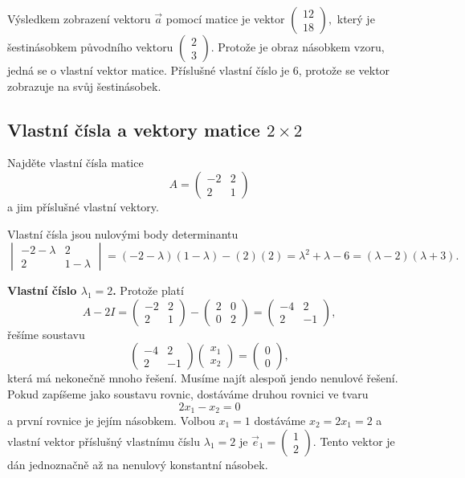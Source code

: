 Výsledkem zobrazení vektoru $\vec a$ pomocí matice je vektor $
\begin{pmatrix}
  12\\18
\end{pmatrix},
$ který je šestinásobkem původního vektoru $
\begin{pmatrix}
  2\\3
\end{pmatrix}$.
Protože je obraz násobkem vzoru, jedná se o vlastní vektor matice. Příslušné vlastní číslo je $6$, protože se vektor zobrazuje na svůj šestinásobek.

\konec


\stranka
\subsection{Vlastní čísla a vektory matice $2\times 2$}

Najděte vlastní čísla matice $$A=
\begin{pmatrix}
  -2 & 2 \\ 2 &1
\end{pmatrix}
$$
a jim příslušné vlastní vektory.

\reseni

Vlastní čísla jsou nulovými body determinantu
$$
\begin{vmatrix}
  -2-\lambda &2 \\ 2 & 1-\lambda
\end{vmatrix}
=(-2-\lambda)(1-\lambda)-(2)(2)=\lambda^2+\lambda-6=(\lambda-2)(\lambda+3).
$$

\textbf{Vlastní číslo $\lambda_1=2$.}
Protože platí $$A-2 I=
\begin{pmatrix}
  -2 & 2\\2&1
\end{pmatrix}
-
\begin{pmatrix}
  2&0\\0&2
\end{pmatrix}=\begin{pmatrix}
  -4 & 2\\ 2 &-1
\end{pmatrix},
$$
řešíme soustavu 
$$
\begin{pmatrix}
-4 & 2\\ 2 &-1
\end{pmatrix}
\begin{pmatrix}
  x_1\\x_2
\end{pmatrix}
=
\begin{pmatrix}
  0\\0
\end{pmatrix},
$$
která má nekonečně mnoho řešení. Musíme najít alespoň jendo nenulové řešení. Pokud zapíšeme jako soustavu rovnic, dostáváme druhou rovnici ve tvaru
$$2x_1-x_2=0$$ a první rovnice je jejím násobkem. Volbou $x_1=1$ dostáváme $x_2=2x_1=2$ a vlastní vektor příslušný vlastnímu číslu $\lambda_1=2$ je $\vec e_1=
\begin{pmatrix}
  1\\2
\end{pmatrix}.
$ Tento vektor je dán jednoznačně až na nenulový konstantní násobek.


